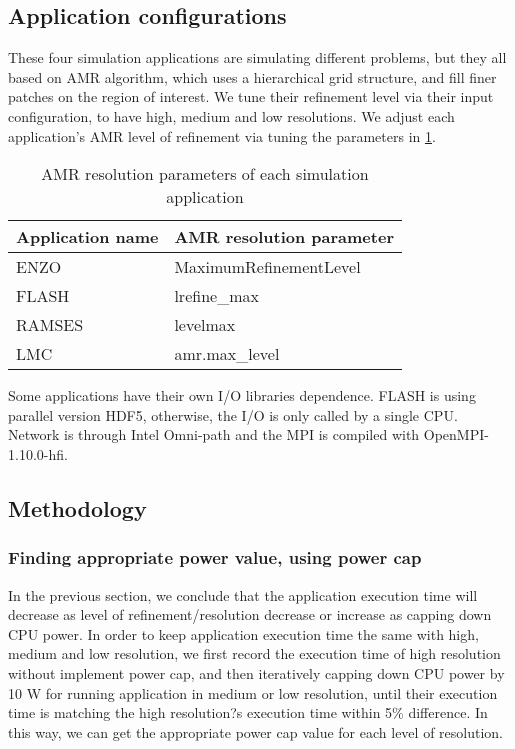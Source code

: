 \subsection{Application configurations}
These four simulation applications are simulating different problems, but they all based on AMR algorithm, which uses a hierarchical grid structure, and fill finer patches on the region of interest. We tune their refinement level via their input configuration, to have high, medium and low resolutions. We adjust each application's AMR level of refinement via tuning the parameters in \ref{table:amr_resolution}.


\begin{table}[H]
\begin{center}
\begin{tabular}{|l|l|}
	\hline
	\textbf{Application name} & \textbf{AMR resolution parameter}\\ \hline
    ENZO & MaximumRefinementLevel\\ 		\hline
    FLASH & lrefine\_max\\				\hline
   RAMSES & levelmax\\			\hline
    LMC & amr.max\_level\\      \hline
\end{tabular}
\caption{AMR resolution parameters of each simulation application}
\label{table:amr_resolution}
\end{center}
\end{table}

Some applications have their own I/O libraries dependence. FLASH is using parallel version HDF5, otherwise, the I/O is only called by a single CPU. Network is through Intel Omni-path and the MPI is compiled with OpenMPI-1.10.0-hfi.



\subsection{Methodology}
\subsubsection{Finding appropriate power value, using power cap}
In the previous section, we conclude that the application execution time will decrease as level of refinement/resolution decrease or increase as capping down CPU power. In order to keep application execution time the same with high, medium and low resolution, we first record the execution time of high resolution without implement power cap, and then iteratively capping down CPU power by 10 W for running application in medium or low resolution, until their execution time is matching the high resolution?s execution time within 5\% difference. In this way, we can get the appropriate power cap value for each level of resolution.

